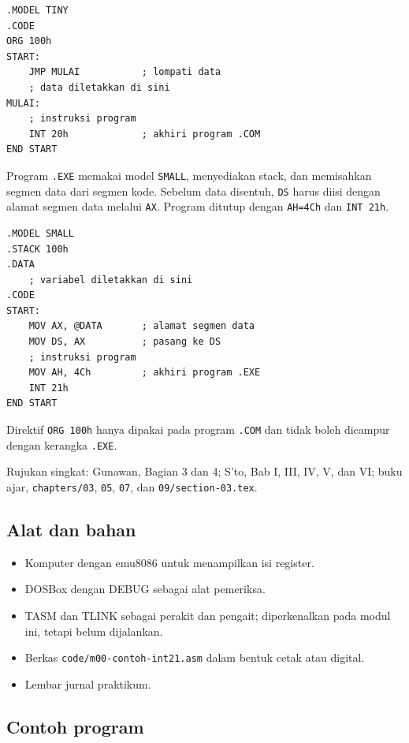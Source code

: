 \begin{lstlisting}[numbers=none]
.MODEL TINY
.CODE
ORG 100h
START:
    JMP MULAI           ; lompati data
    ; data diletakkan di sini
MULAI:
    ; instruksi program
    INT 20h             ; akhiri program .COM
END START
\end{lstlisting}

Program \texttt{.EXE} memakai model \texttt{SMALL}, menyediakan
stack, dan memisahkan segmen data dari segmen kode. Sebelum data
disentuh, \texttt{DS} harus diisi dengan alamat segmen data melalui
\texttt{AX}. Program ditutup dengan \texttt{AH=4Ch} dan
\texttt{INT 21h}.

\begin{lstlisting}[numbers=none]
.MODEL SMALL
.STACK 100h
.DATA
    ; variabel diletakkan di sini
.CODE
START:
    MOV AX, @DATA       ; alamat segmen data
    MOV DS, AX          ; pasang ke DS
    ; instruksi program
    MOV AH, 4Ch         ; akhiri program .EXE
    INT 21h
END START
\end{lstlisting}

Direktif \texttt{ORG 100h} hanya dipakai pada program \texttt{.COM}
dan tidak boleh dicampur dengan kerangka \texttt{.EXE}.

\begin{rujukan}
Rujukan singkat: Gunawan, Bagian 3 dan 4; S'to, Bab I, III, IV, V,
dan VI; buku ajar, \texttt{chapters/03}, \texttt{05}, \texttt{07},
dan \texttt{09/section-03.tex}.
\end{rujukan}

\subsection{Alat dan bahan}

\begin{itemize}
    \item Komputer dengan emu8086 untuk menampilkan isi register.
    \item DOSBox dengan DEBUG sebagai alat pemeriksa.
    \item TASM dan TLINK sebagai perakit dan pengait; diperkenalkan
          pada modul ini, tetapi belum dijalankan.
    \item Berkas \texttt{code/m00-contoh-int21.asm} dalam bentuk
          cetak atau digital.
    \item Lembar jurnal praktikum.
\end{itemize}

\subsection{Contoh program}

